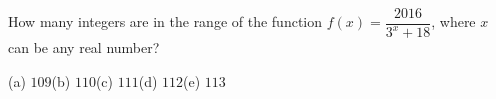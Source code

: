 How many integers are in the range of the function $f(x)=\dfrac{2016}{3^x+18}$, where $x$ can be any real number?

(a) $109$\quad (b) $110$\quad (c) $111$\quad (d) $112$\quad (e) $113$
